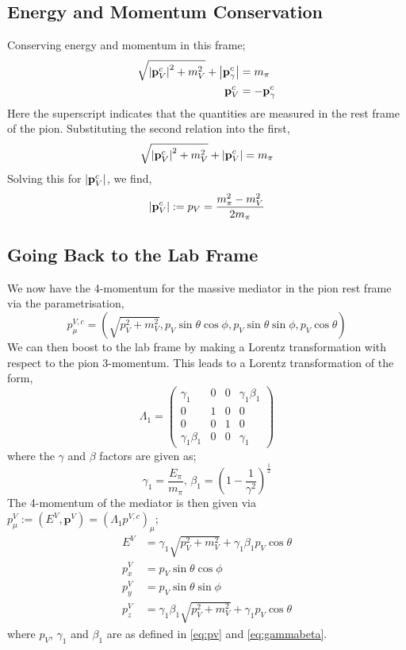 \documentclass[10pt]{article}
\begin{document}
\subsection{Energy and Momentum Conservation}
\noindent Conserving energy and momentum in this frame;
\begin{align}
  \sqrt{\left| \mathbf{p}_V^c \right|^2 + m_V^2} + \left| \mathbf{p}_\gamma^c \right| &= m_\pi \\
  \mathbf{p}_V^c &= -\mathbf{p}_\gamma^c
\end{align}
Here the superscript indicates that the quantities are measured in the rest frame of the pion. Substituting the second relation into the first,
\begin{equation}
  \sqrt{\left| \mathbf{p}_V^c \right|^2 + m_V^2} + \left| \mathbf{p}_V^c \right| = m_\pi
\end{equation}
Solving this for $\left| \mathbf{p}_V^c \right|$, we find,
\begin{equation}
  \label{eq:pv}
  \left| \mathbf{p}_V^c \right| := p_V = \frac{m_\pi^2 - m_V^2}{2m_\pi}
\end{equation}
\subsection{Going Back to the Lab Frame}
We now have the 4-momentum for the massive mediator in the pion rest frame via the parametrisation,
\begin{equation}
  p^{V,c}_\mu = (\sqrt{p_V^2 + m_V^2}, p_V\sin\theta\cos\phi, p_V\sin\theta\sin\phi, p_V\cos\theta)
\end{equation}
We can then boost to the lab frame by making a Lorentz transformation with respect to the pion 3-momentum. This leads to a Lorentz transformation of the form,
\begin{equation}
  \Lambda_1 = \begin{pmatrix} \gamma_1 & 0 & 0 & \gamma_1\beta_1 \\ 0 & 1 & 0 & 0 \\ 0 & 0 & 1 & 0 \\ \gamma_1\beta_1 & 0 & 0 & \gamma_1 \end{pmatrix}
\end{equation}
where the $\gamma$ and $\beta$ factors are given as;
\begin{equation}
  \label{eq:gammabeta}
  \gamma_1 = \frac{E_\pi}{m_\pi}, \, \beta_1 = \left(1 - \frac{1}{\gamma^2}\right)^{\frac{1}{2}}
\end{equation}
The 4-momentum of the mediator is then given via $p_\mu^V := (E^V, \mathbf{p}^V) = (\Lambda_1 p^{V, c})_\mu$;
\begin{align}
  E^V &= \gamma_1\sqrt{p_V^2 + m_V^2} + \gamma_1\beta_1p_V\cos\theta \\
  p^V_x &= p_V \sin\theta\cos\phi \label{eq:pvx} \\
  p^V_y &= p_V \sin\theta\sin\phi \\
  p^V_z &= \gamma_1\beta_1\sqrt{p_V^2 + m_V^2} + \gamma_1 p_V \cos\theta \label{eq:pvz}
\end{align}
where $p_V$, $\gamma_1$ and $\beta_1$ are as defined in \eqref{eq:pv} and \eqref{eq:gammabeta}.
\end{document}
